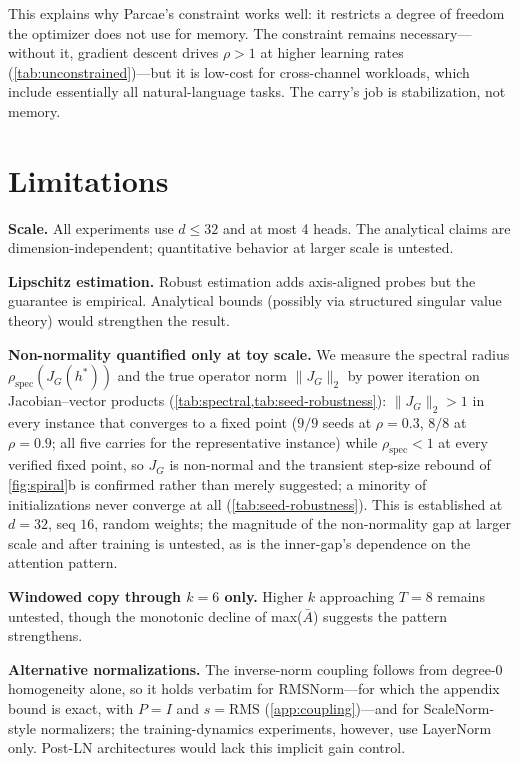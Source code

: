 \documentclass[11pt]{article}
\begin{document}
This explains why Parcae's constraint works well: it restricts a degree of freedom the optimizer does not use for memory. The constraint remains necessary---without it, gradient descent drives $\rho > 1$ at higher learning rates (\cref{tab:unconstrained})---but it is low-cost for cross-channel workloads, which include essentially all natural-language tasks. The carry's job is stabilization, not memory.


\section{Limitations}
\label{sec:limitations}

\textbf{Scale.} All experiments use $d \le 32$ and at most 4 heads. The analytical claims are dimension-independent; quantitative behavior at larger scale is untested.

\textbf{Lipschitz estimation.} Robust estimation adds axis-aligned probes but the guarantee is empirical. Analytical bounds (possibly via structured singular value theory) would strengthen the result.

\textbf{Non-normality quantified only at toy scale.} We measure the spectral radius $\rho_{\text{spec}}(J_G(h^*))$ and the true operator norm $\|J_G\|_2$ by power iteration on Jacobian--vector products (\cref{tab:spectral,tab:seed-robustness}): $\|J_G\|_2 > 1$ in every instance that converges to a fixed point ($9/9$ seeds at $\rho = 0.3$, $8/8$ at $\rho = 0.9$; all five carries for the representative instance) while $\rho_{\text{spec}} < 1$ at every verified fixed point, so $J_G$ is non-normal and the transient step-size rebound of \cref{fig:spiral}b is confirmed rather than merely suggested; a minority of initializations never converge at all (\cref{tab:seed-robustness}). This is established at $d=32$, seq $16$, random weights; the magnitude of the non-normality gap at larger scale and after training is untested, as is the inner-gap's dependence on the attention pattern.

\textbf{Windowed copy through $k=6$ only.} Higher $k$ approaching $T=8$ remains untested, though the monotonic decline of max($\bar{A}$) suggests the pattern strengthens.

\textbf{Alternative normalizations.} The inverse-norm coupling follows from degree-0 homogeneity alone, so it holds verbatim for RMSNorm---for which the appendix bound is exact, with $P = I$ and $s = \text{RMS}$ (\cref{app:coupling})---and for ScaleNorm-style normalizers; the training-dynamics experiments, however, use LayerNorm only. Post-LN architectures would lack this implicit gain control.
\end{document}
